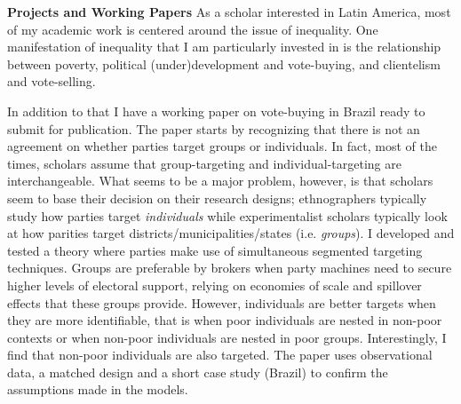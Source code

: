 \documentclass[11pt]{letter} %
\begin{document}
\begin{letter}{}
{\bf Projects and Working Papers} As a scholar interested in Latin America, most of my academic work is centered around the issue of inequality. One manifestation of inequality that I am particularly invested in is the relationship between poverty, political (under)development and vote-buying, and clientelism and vote-selling. 

In addition to that I have a working paper on vote-buying in Brazil ready to submit for publication. The paper starts by recognizing that there is not an agreement on whether parties target groups or individuals. In fact, most of the times, scholars assume that group-targeting and individual-targeting are interchangeable. What seems to be a major problem, however, is that scholars seem to base their decision on their research designs; ethnographers typically study how parties target \emph{individuals} while experimentalist scholars typically look at how parities target districts/municipalities/states (i.e. \emph{groups}). I developed and tested a theory where parties make use of simultaneous segmented targeting techniques. Groups are preferable by brokers when party machines need to secure higher levels of electoral support, relying on economies of scale and spillover effects that these groups provide. However, individuals are better targets when they are more identifiable, that is when poor individuals are nested in non-poor contexts or when non-poor individuals are nested in poor groups. Interestingly, I find that non-poor individuals are also targeted. The paper uses observational data, a matched design and a short case study (Brazil) to confirm the assumptions made in the models.



\end{letter}
\end{document}
